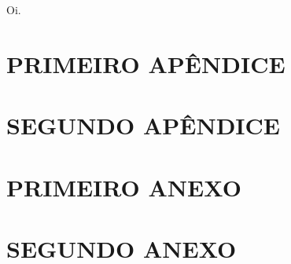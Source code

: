 \documentclass[
  12pt,
  oneside,
  a4paper,
  chapter=TITLE,
  section=TITLE,
  subsubsection=TITLE,
  brazil]{abntex2}
\begin{document}
Oi.


\printbibliography


\postextual

\begin{apendicesenv}
\partapendices

\chapter{PRIMEIRO APÊNDICE}

\lipsum[50]

\chapter{SEGUNDO APÊNDICE}

\lipsum[50]

\end{apendicesenv}

\begin{anexosenv}
\partanexos

\chapter{PRIMEIRO ANEXO}

\lipsum[30]

\chapter{SEGUNDO ANEXO}

\lipsum[30]

\end{anexosenv}

\printindex
\end{document}
